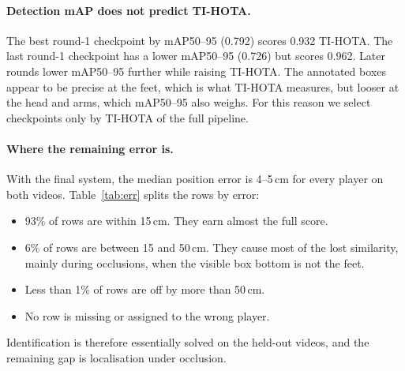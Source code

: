 \documentclass[11pt,a4paper]{article}
\begin{document}
\paragraph{Detection mAP does not predict TI-HOTA.}
The best round-1 checkpoint by mAP50--95 (0.792) scores 0.932 TI-HOTA. The last round-1 checkpoint has a
lower mAP50--95 (0.726) but scores 0.962. Later rounds lower mAP50--95 further while raising TI-HOTA.
The annotated boxes appear to be precise at the feet, which is what TI-HOTA measures, but looser at the
head and arms, which mAP50--95 also weighs. For this reason we select checkpoints only by TI-HOTA of the
full pipeline.

\paragraph{Where the remaining error is.}
With the final system, the median position error is 4--5\,cm for every player on both videos.
Table~\ref{tab:err} splits the rows by error:
\begin{itemize}
\item 93\% of rows are within 15\,cm. They earn almost the full score.
\item 6\% of rows are between 15 and 50\,cm. They cause most of the lost similarity, mainly during
occlusions, when the visible box bottom is not the feet.
\item Less than 1\% of rows are off by more than 50\,cm.
\item No row is missing or assigned to the wrong player.
\end{itemize}
Identification is therefore essentially solved on the held-out videos, and the remaining gap is
localisation under occlusion.

\begin{table}[t]
\centering
\caption{Error breakdown of the final system on the Challenge-style validation videos: share of rows and of
the similarity lost, per distance band.}
\label{tab:err}
\small
{}
\end{table}
\end{document}
